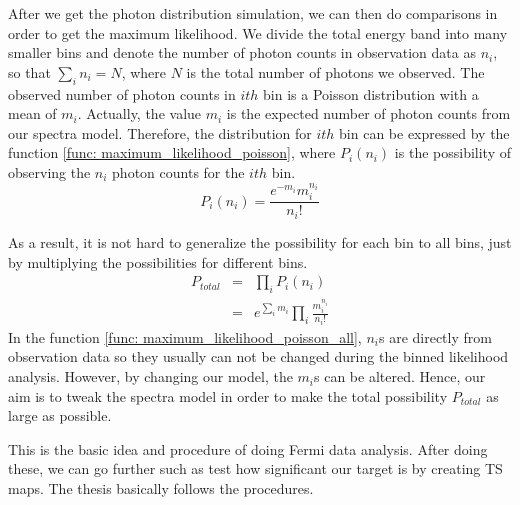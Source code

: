 \documentclass[12pt]{report}
\begin{document}
          After we get the photon distribution simulation, we can then do comparisons in order to get 
          the maximum likelihood. We divide the total energy band into many smaller bins and denote
          the number of photon counts in observation data as $n_{i}$, so that $\sum_{i}^{}n_{i} = N$, 
          where $N$ is the total number of photons we observed. The observed number of photon counts
          in $ith$ bin is a Poisson distribution with a mean of $m_{i}$. Actually, the value $m_{i}$ is the 
          expected number of photon counts from our spectra model. Therefore, the distribution for $ith$ bin
          can be expressed by the function \ref{func: maximum_likelihood_poisson}, where 
          $P_{i}\left(n_{i}\right)$ is the possibility of observing the $n_{i}$ photon counts for the $ith$
          bin. 
          \begin{equation}
            P_{i}\left(n_{i}\right) = \frac{e^{-m_{i}} m_{i}^{n_{i}}}{n_{i}!}
            \label{func: maximum_likelihood_poisson}
          \end{equation}

          As a result, it is not hard to generalize the possibility for each bin to all bins, just 
          by multiplying the possibilities for different bins.
          \begin{eqnarray}
            P_{total} &=& \prod_{i}^{}P_{i}\left(n_{i}\right) \nonumber \\ 
                      &=& e^{\sum_{i}^{}m_i}\prod_{i}^{}\frac{m_{i}^{n_i}}{n_i!}
            \label{func: maximum_likelihood_poisson_all}
          \end{eqnarray}
          In the function \ref{func: maximum_likelihood_poisson_all}, $n_i$s are directly 
          from observation data so they usually can not be changed during the binned likelihood 
          analysis. However, by changing our model, the $m_i$s can be altered. 
          Hence, our aim is to tweak the spectra model in order to make the total possibility 
          $P_{total}$ as large as possible. 

          This is the basic idea and procedure of doing Fermi data analysis. After doing these,
          we can go further such as test how significant our target is by creating TS maps. The 
          thesis basically follows the procedures. 
      
\end{document}
